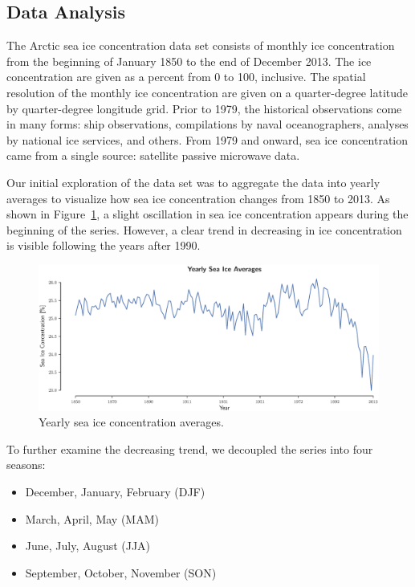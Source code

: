 \documentclass[12pt]{article}
\begin{document}
\subsection{Data Analysis}
The Arctic sea ice concentration data set consists of monthly ice concentration from the beginning of January 1850 to the end of December 2013. The ice concentration are given as a percent from 0 to 100, inclusive. The spatial resolution of the monthly ice concentration are given on a quarter-degree latitude by quarter-degree longitude grid. Prior to 1979, the historical observations come in many forms: ship observations, compilations by naval oceanographers, analyses by national ice services, and others. From 1979 and onward, sea ice concentration came from a single source: satellite passive microwave data.

Our initial exploration of the data set was to aggregate the data into yearly averages to visualize how sea ice concentration changes from 1850 to 2013. As shown in Figure~\ref{yrly_avgs}, a slight oscillation in sea ice concentration appears during the beginning of the series. However, a clear trend in decreasing in ice concentration is visible following the years after 1990.

\begin{figure}[!htbp]
  \centering
  \includegraphics[width=1\textwidth,center]{figs/yrly_avgs}
  \caption{Yearly sea ice concentration averages.}\label{yrly_avgs}
\end{figure}

To further examine the decreasing trend, we decoupled the series into four seasons:
\begin{itemize}
\item December, January, February (DJF)
\item March, April, May (MAM)
\item June, July, August (JJA)
\item September, October, November (SON)
\end{itemize}
\end{document}
